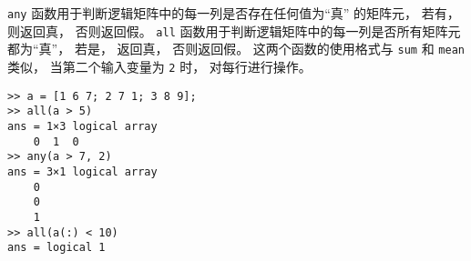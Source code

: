 \verb|any| 函数用于判断逻辑矩阵中的每一列是否存在任何值为“真” 的矩阵元， 若有， 则返回真， 否则返回假。 \verb|all| 函数用于判断逻辑矩阵中的每一列是否所有矩阵元都为“真”， 若是， 返回真， 否则返回假。 这两个函数的使用格式与 \verb|sum| 和 \verb|mean| 类似， 当第二个输入变量为 \verb|2| 时， 对每行进行操作。
\begin{lstlisting}[language=matlabC]
>> a = [1 6 7; 2 7 1; 3 8 9];
>> all(a > 5)
ans = 1×3 logical array
    0  1  0
>> any(a > 7, 2)
ans = 3×1 logical array
    0
    0
    1
>> all(a(:) < 10)
ans = logical 1
\end{lstlisting}
